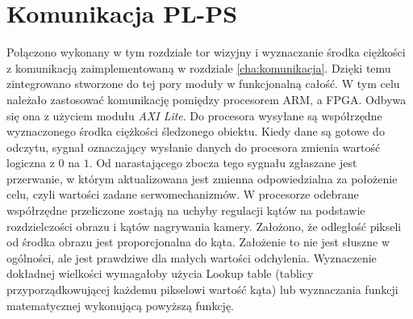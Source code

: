 \section{Komunikacja PL-PS}
\label{komunikacjapl-ps}

Połączono wykonany w tym rozdziale tor wizyjny i wyznaczanie środka ciężkości z komunikacją zaimplementowaną w rozdziale \ref{cha:komunikacja}.
Dzięki temu zintegrowano stworzone do tej pory moduły w funkcjonalną całość.
W tym celu należało zastosować komunikację pomiędzy procesorem ARM, a FPGA.
Odbywa się ona z użyciem modułu \textit{AXI Lite}.
Do procesora wysyłane są współrzędne wyznaczonego środka ciężkości śledzonego obiektu. 
Kiedy dane są gotowe do odczytu, sygnał oznaczający wysłanie danych do procesora zmienia wartość logiczna z \(0\) na \(1\).
Od narastającego zbocza tego sygnału zgłaszane jest przerwanie, w którym aktualizowana jest zmienna odpowiedzialna za położenie celu, czyli wartości zadane serwomechanizmów. 
W procesorze odebrane współrzędne przeliczone zostają na uchyby regulacji kątów na podstawie rozdzielczości obrazu i kątów nagrywania kamery. 
Założono, że odległość pikseli od środka obrazu jest proporcjonalna do kąta.
Założenie to nie jest słuszne w ogólności, ale jest prawdziwe dla małych wartości odchylenia.
Wyznaczenie dokładnej wielkości wymagałoby użycia Lookup table (tablicy przyporządkowującej każdemu pikselowi wartość kąta) lub wyznaczania funkcji matematycznej wykonującą powyższą funkcję.



